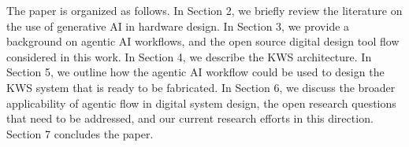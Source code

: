 The paper is organized as follows. In Section 2, we briefly review the literature on the use of generative AI in hardware design. In Section 3, we provide a background on agentic AI workflows, and the open source digital design tool flow considered in this work. In Section 4, we describe the KWS architecture. In Section 5, we outline how the agentic AI workflow could be used to design the KWS system that is ready to be fabricated. In Section 6, we discuss the broader applicability of agentic flow in digital system design, the open research questions that need to be addressed, and our current research efforts in this direction. Section 7 concludes the paper.

